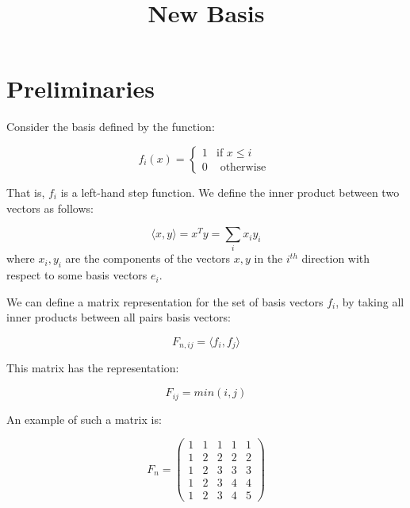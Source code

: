 \documentclass{article}
\title{New Basis}
\begin{document}
\maketitle

\section{Preliminaries}
Consider the basis defined by the function:

\begin{equation}
f_i\left(x\right) =
\begin{cases}
1 & \text{if } x \leq i \\
0 & \text{ otherwise } 
\end{cases}
\label{basis}
\end{equation}

That is, \(f_i\) is a left-hand step function. We define the inner product between two vectors as follows:

\begin{definition}
\begin{equation}
\langle x, y \rangle = x^T y = \sum_i x_i y_i
\end{equation}	
where \(x_i, y_i\) are the components of the vectors \(x,y\) in the \(i^{th}\) direction with respect to some basis vectors \(e_i\).
\end{definition}

We can define a matrix representation for the set of basis vectors \(f_i\), by taking all inner products between all pairs basis vectors:

\begin{definition}
\begin{equation}
F_{n, ij} = \langle f_i, f_j \rangle
\end{equation}

This matrix has the representation:

\begin{equation}
F_{ij} = min(i,j)
\end{equation}

An example of such a matrix is:

\begin{equation}
F_n= \begin{pmatrix}
 1 & 1 & 1 & 1  & 1 \\
  1 & 2 & 2 & 2  & 2\\
     1 & 2 & 3 & 3  & 3  \\
    1 & 2 & 3 & 4  & 4  \\
     1 & 2 & 3 & 4  & 5 
\end{pmatrix}
\end{equation}
\end{definition}
\end{document}
